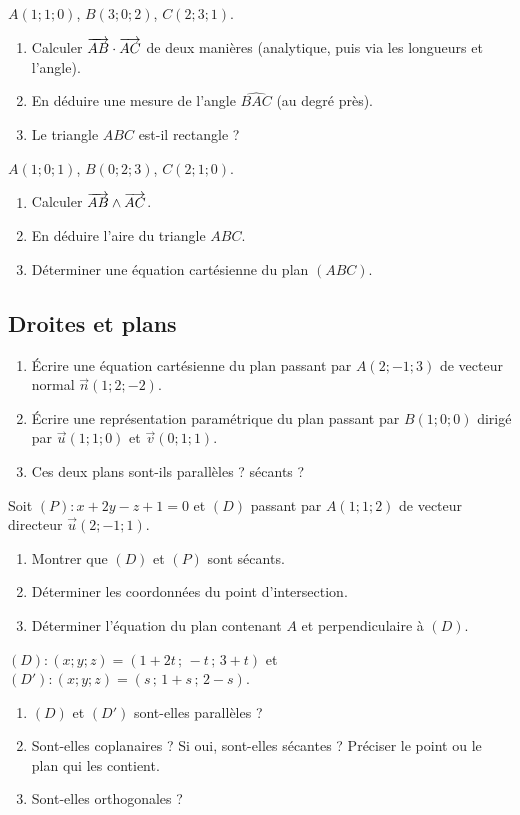 $A(1;1;0)$, $B(3;0;2)$, $C(2;3;1)$.
\begin{enumerate}
	\item Calculer $\overrightarrow{AB} \cdot \overrightarrow{AC}$ de deux manières
	(analytique, puis via les longueurs et l'angle).
	\item En déduire une mesure de l'angle $\widehat{BAC}$ (au degré près).
	\item Le triangle $ABC$ est-il rectangle ?
\end{enumerate}

$A(1;0;1)$, $B(0;2;3)$, $C(2;1;0)$.
\begin{enumerate}
	\item Calculer $\overrightarrow{AB} \wedge \overrightarrow{AC}$.
	\item En déduire l'aire du triangle $ABC$.
	\item Déterminer une équation cartésienne du plan $(ABC)$.
\end{enumerate}

\subsection{Droites et plans}

\begin{enumerate}
	\item Écrire une équation cartésienne du plan passant par $A(2;-1;3)$ de
	vecteur normal $\vec n(1;2;-2)$.
	\item Écrire une représentation paramétrique du plan passant par
	$B(1;0;0)$ dirigé par $\vec u(1;1;0)$ et $\vec v(0;1;1)$.
	\item Ces deux plans sont-ils parallèles ? sécants ?
\end{enumerate}

Soit $(P) : x + 2y - z + 1 = 0$ et $(D)$ passant par $A(1;1;2)$ de vecteur
directeur $\vec u(2;-1;1)$.
\begin{enumerate}
	\item Montrer que $(D)$ et $(P)$ sont sécants.
	\item Déterminer les coordonnées du point d'intersection.
	\item Déterminer l'équation du plan contenant $A$ et perpendiculaire à $(D)$.
\end{enumerate}

$(D) : (x;y;z) = (1 + 2t\,;\,-t\,;\,3 + t)$ et
$(D') : (x;y;z) = (s\,;\,1 + s\,;\,2 - s)$.
\begin{enumerate}
	\item $(D)$ et $(D')$ sont-elles parallèles ?
	\item Sont-elles coplanaires ? Si oui, sont-elles sécantes ? Préciser le
	point ou le plan qui les contient.
	\item Sont-elles orthogonales ?
\end{enumerate}

